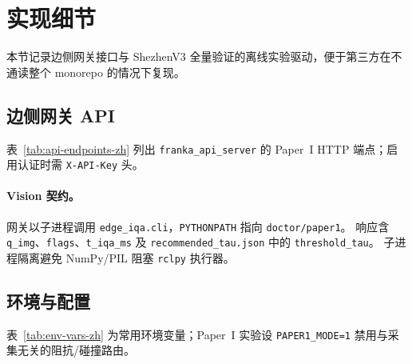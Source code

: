 \section{实现细节}
\label{sec:implementation-zh}

本节记录边侧网关接口与 ShezhenV3 全量验证的离线实验驱动，便于第三方在不通读整个 monorepo 的情况下复现。

\subsection{边侧网关 API}
表~\ref{tab:api-endpoints-zh} 列出 \texttt{franka\_api\_server} 的 Paper~I HTTP 端点；启用认证时需 \texttt{X-API-Key} 头。

\begin{table}[t]
\centering
\caption{边侧网关端点（Paper~I）。}
\label{tab:api-endpoints-zh}
\small
{}
\end{table}

\paragraph{Vision 契约。}
网关以子进程调用 \texttt{edge\_iqa.cli}，\texttt{PYTHONPATH} 指向 \texttt{doctor/paper1}。
响应含 \texttt{q\_img}、\texttt{flags}、\texttt{t\_iqa\_ms} 及 \texttt{recommended\_tau.json} 中的 \texttt{threshold\_tau}。
子进程隔离避免 NumPy/PIL 阻塞 \texttt{rclpy} 执行器。

\subsection{环境与配置}
表~\ref{tab:env-vars-zh} 为常用环境变量；Paper~I 实验设 \texttt{PAPER1\_MODE=1} 禁用与采集无关的阻抗/碰撞路由。


